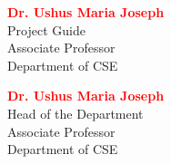 \begin{minipage}[t]{0.45\textwidth} 
    \raggedright %
    \textcolor{red}{\textbf{Dr. Ushus Maria Joseph}} \\
    Project Guide \\
    Associate Professor \\
    Department of CSE
\end{minipage}
\hfill %
\begin{minipage}[t]{0.45\textwidth} 
    \raggedright %
    \textcolor{red}{\textbf{Dr. Ushus Maria Joseph}} \\
    Head of the Department \\
    Associate Professor \\
    Department of CSE
\end{minipage}



\thispagestyle{empty}



\thispagestyle{empty}